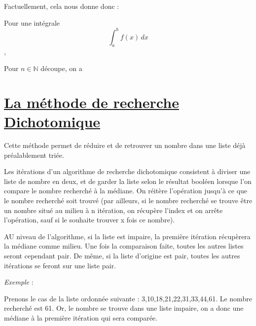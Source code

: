 \documentclass{article}
\begin{document}
    Factuellement, cela nous donne donc :
    
    Pour une intégrale
    \begin{equation*}
        \int_{a}^{b} f(x) \,dx
    \end{equation*},

    Pour $n \in \mathbb{N} $ découpe, on a

\section{\underline{La méthode de recherche Dichotomique}}

    Cette méthode permet de réduire et de retrouver un nombre dans une liste déjà préalablement triée.

    Les itérations d'un algorithme de recherche dichotomique consistent à diviser une liste de nombre en deux, et de garder la liste selon le résultat booléen lorsque l'on compare le nombre recherché à la médiane.
    On réitère l'opération jusqu'à ce que le nombre recherché soit trouvé (par ailleurs, si le nombre recherché se trouve être un nombre situé au milieu à n itération, on récupère l'index et on arrête l'opération, sauf si le souhaite trouver x fois ce nombre).

    AU niveau de l'algorithme, si la liste est impaire, la première itération récupèrera la médiane comme milieu. Une fois la comparaison faite, toutes les autres listes seront cependant pair. De même, si la liste d'origine est pair, toutes les autres itérations se feront sur une liste pair.
    
    \textit{Exemple }:

    Prenons le cas de la liste ordonnée suivante : {3,10,18,21,22,31,33,44,61}.
    Le nombre recherché est 61.
    Or, le nombre se trouve dans une liste impaire, on a donc une médiane à la première itération qui sera comparée.
    
    
\end{document}
